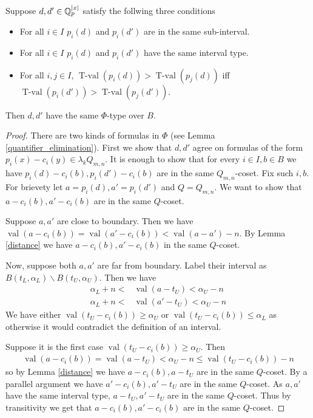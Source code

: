\documentclass{amsart}
\DeclareMathOperator{\val}{val}
\DeclareMathOperator{\tval}{T-val}
\begin{document}
\begin{Lemma} \label{main_lemma}
  Suppose $d, d' \in \mathbb{Q}_p^{|x|}$ satisfy the follwing three conditions 
  \begin{itemize}
  \item For all $i \in I$ $p_i(d)$ and $p_i(d')$ are in the same sub-interval.
  \item For all $i \in I$ $p_i(d)$ and $p_i(d')$ have the same interval type.
  \item For all $i,j \in I$, $\tval(p_i(d)) > \tval(p_j(d))$ iff $\tval(p_i(d')) > \tval(p_j(d'))$.
  \end{itemize}
  Then $d, d'$ have the same $\Phi$-type over $B$.
\end{Lemma}
\begin{proof}
  There are two kinds of formulas in $\Phi$
  (see Lemma \ref{quantifier_elimination}).
  First we show that $d, d'$ agree on formulas of the form $p_i(x) - c_i(y) \in \lambda_k Q_{m,n}$.
  It is enough to show that for every $i \in I, b \in B$ we have $p_i(d) - c_i(b), p_i(d') - c_i(b)$ are in the same $Q_{m,n}$-coset.
  Fix such $i, b$.
  For brievety let $a = p_i(d), a' = p_i(d')$ and $Q = Q_{m,n}$.
  We want to show that $a - c_i(b), a' - c_i(b)$ are in the same $Q$-coset.
  
  Suppose $a, a'$ are close to boundary.
  Then we have $\val(a - c_i(b)) = \val(a' - c_i(b)) < \val(a - a') - n$.
  By Lemma \ref{distance} we have $a - c_i(b), a' - c_i(b)$ in the same $Q$-coset.
  
  Now, suppose both $a, a'$ are far from boundary.
  Label their interval as $B(t_L, \alpha_L) \backslash B(t_U, \alpha_U)$.
  Then we have 
  \begin{align*}
    \alpha_L + n < &\val (a - t_U) < \alpha_U - n \\
    \alpha_L + n < &\val (a' - t_U) < \alpha_U - n
  \end{align*}
  We have either $\val(t_U - c_i(b)) \geq \alpha_U$ or $\val(t_U - c_i(b)) \leq \alpha_L$
  as otherwise it would contradict the definition of an interval.
  
  Suppose it is the first case $\val(t_U - c_i(b)) \geq \alpha_U$.
  Then
  \begin{align*}
    \val(a - c_i(b)) = \val(a - t_U) < \alpha_U - n \leq \val(t_U - c_i(b)) - n
  \end{align*}
  so by Lemma \ref{distance} we have $a - c_i(b), a - t_U$ are in the same $Q$-coset.
  By a parallel argument we have $a' - c_i(b), a' - t_U$ are in the same $Q$-coset.
  As $a, a'$ have the same interval type, $a - t_U, a' - t_U$ are in the same $Q$-coset.
  Thus by transitivity we get that $a - c_i(b), a' - c_i(b)$ are in the same $Q$-coset.
  

\end{proof}
\end{document}
